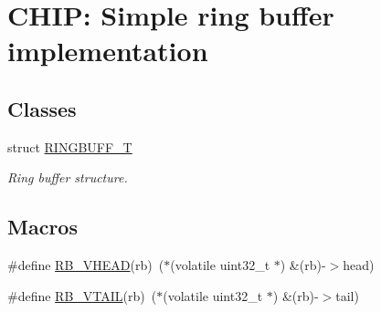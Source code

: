 \hypertarget{group___ring___buffer}{}\section{C\+H\+IP\+: Simple ring buffer implementation}
\label{group___ring___buffer}
\subsection*{Classes}
\begin{DoxyCompactItemize}
\item 
struct \hyperlink{struct_r_i_n_g_b_u_f_f___t}{R\+I\+N\+G\+B\+U\+F\+F\+\_\+T}
\begin{DoxyCompactList}\small\item\em Ring buffer structure. \end{DoxyCompactList}\end{DoxyCompactItemize}
\subsection*{Macros}
\begin{DoxyCompactItemize}
\item 
\#define \hyperlink{group___ring___buffer_gab0e914e769172c3291a9cc36962bc4de}{R\+B\+\_\+\+V\+H\+E\+AD}(rb)~($\ast$(volatile uint32\+\_\+t $\ast$) \&(rb)-\/$>$head)
\item 
\#define \hyperlink{group___ring___buffer_ga9f7c4d3e3029e8318582a147a5c37674}{R\+B\+\_\+\+V\+T\+A\+IL}(rb)~($\ast$(volatile uint32\+\_\+t $\ast$) \&(rb)-\/$>$tail)
\end{DoxyCompactItemize}
